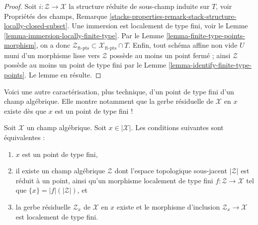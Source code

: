 \begin{proof}
Soit $i : \mathcal{Z} \to \mathcal{X}$ la structure réduite de sous-champ
induite sur $T$, voir Propriétés des champs,
Remarque \ref{stacks-properties-remark-stack-structure-locally-closed-subset}.
Une immersion est localement de type fini, voir le
Lemme \ref{lemma-immersion-locally-finite-type}.
Par le Lemme \ref{lemma-finite-type-points-morphism}, on a donc
$\mathcal{Z}_{\text{ft-pts}} \subset \mathcal{X}_{\text{ft-pts}} \cap T$.
Enfin, tout schéma affine non vide $U$ muni d'un morphisme lisse vers
$\mathcal{Z}$ possède au moins un point fermé ; ainsi $\mathcal{Z}$ possède
au moins un point de type fini par le
Lemme \ref{lemma-identify-finite-type-points}.
Le lemme en résulte.
\end{proof}

\noindent
Voici une autre caractérisation, plus technique, d'un point de type fini d'un
champ algébrique. Elle montre notamment que la gerbe résiduelle de
$\mathcal{X}$ en $x$ existe dès que $x$ est un point de type fini !

\begin{lemma}
\label{lemma-point-finite-type-monomorphism}
Soit $\mathcal{X}$ un champ algébrique.
Soit $x \in |\mathcal{X}|$. Les conditions suivantes sont équivalentes :
\begin{enumerate}
\item $x$ est un point de type fini,
\item il existe un champ algébrique $\mathcal{Z}$ dont l'espace topologique
sous-jacent $|\mathcal{Z}|$ est réduit à un point, ainsi qu'un morphisme
localement de type fini $f : \mathcal{Z} \to \mathcal{X}$ tel que
$\{x\} = |f|(|\mathcal{Z}|)$, et
\item la gerbe résiduelle $\mathcal{Z}_x$ de $\mathcal{X}$ en $x$ existe et
le morphisme d'inclusion $\mathcal{Z}_x \to \mathcal{X}$ est localement de
type fini.
\end{enumerate}
\end{lemma}

